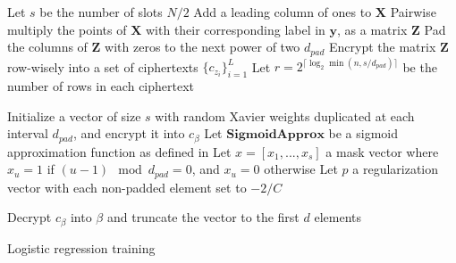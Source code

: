 \documentclass[a4paper,11pt,oneside]{report}
\begin{document}
\begin{algorithm}

  \LinesNumbered
  \DontPrintSemicolon
  \SetAlgoLined

  
  Let $s$ be the number of slots $N / 2$\;
  \;
  Add a leading column of ones to $\mathbf{X}$\;
  Pairwise multiply the points of $\mathbf{X}$ with their corresponding label in $\mathbf{y}$, as a matrix $\mathbf{Z}$\;
  Pad the columns of $\mathbf{Z}$ with zeros to the next power of two $d_{pad}$\;
  Encrypt the matrix $\mathbf{Z}$ row-wisely into a set of ciphertexts $\{c_{z_i}\}_{i=1}^L$\;
  Let $r = 2^{\lceil\log_2\min(n, s / d_{pad})\rceil}$ be the number of rows in each ciphertext\;

  \;
  Initialize a vector of size $s$ with random Xavier weights duplicated at each interval $d_{pad}$, and encrypt it into $c_\beta$\;
  Let $\mathbf{SigmoidApprox}$ be a sigmoid approximation function as defined in \cite{kim_logistic_2018}\;
  Let $x = [x_1, ..., x_s]$ a mask vector where $x_u = 1$ if $(u-1) \mod d_{pad}=0$, and $x_u=0$ otherwise\;
  Let $p$ a regularization vector with each non-padded element set to $-2/C$\;

  \;
  Decrypt $c_\beta$ into $\beta$ and truncate the vector to the first $d$ elements\;

\caption{Logistic regression training}
\label{algo:lr_training}

\end{algorithm}


\end{document}
